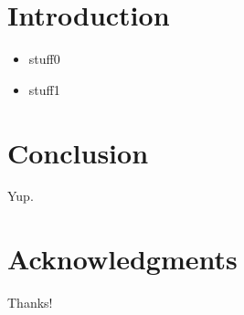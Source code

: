 \documentclass{article}
\begin{document}
\section{Introduction}
\begin{itemize}
\item stuff0
\item stuff1
\end{itemize}

\section{Conclusion}
Yup.

\section{Acknowledgments}
Thanks!
\end{document}
